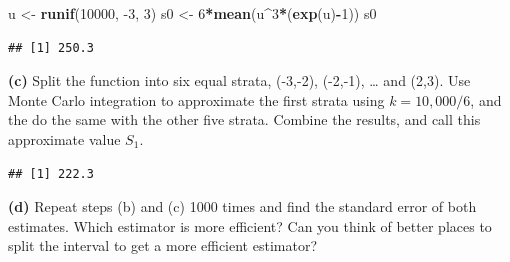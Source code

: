 \documentclass[
]{article}
\newenvironment{Shaded}{\begin{snugshade}}{\end{snugshade}}
\newcommand{\DecValTok}[1]{\textcolor[rgb]{0.00,0.00,0.81}{#1}}
\newcommand{\KeywordTok}[1]{\textcolor[rgb]{0.13,0.29,0.53}{\textbf{#1}}}
\newcommand{\NormalTok}[1]{#1}
\newcommand{\OperatorTok}[1]{\textcolor[rgb]{0.81,0.36,0.00}{\textbf{#1}}}
\newcommand{\StringTok}[1]{\textcolor[rgb]{0.31,0.60,0.02}{#1}}
\begin{document}
\begin{Shaded}
\begin{Highlighting}[]
\NormalTok{u <-}\StringTok{ }\KeywordTok{runif}\NormalTok{(}\DecValTok{10000}\NormalTok{, }\DecValTok{-3}\NormalTok{, }\DecValTok{3}\NormalTok{)}
\NormalTok{s0 <-}\StringTok{ }\DecValTok{6}\OperatorTok{*}\KeywordTok{mean}\NormalTok{(u}\OperatorTok{^}\DecValTok{3}\OperatorTok{*}\NormalTok{(}\KeywordTok{exp}\NormalTok{(u)}\OperatorTok{-}\DecValTok{1}\NormalTok{))}
\NormalTok{s0}
\end{Highlighting}
\end{Shaded}

\begin{verbatim}
## [1] 250.3
\end{verbatim}

\textbf{(c)} Split the function into six equal strata, (-3,-2), (-2,-1),
\ldots{} and (2,3). Use Monte Carlo integration to approximate the first
strata using \(k=10,000/6\), and the do the same with the other five
strata. Combine the results, and call this approximate value \(S_1\).

\begin{verbatim}
## [1] 222.3
\end{verbatim}

\textbf{(d)} Repeat steps (b) and (c) 1000 times and find the standard
error of both estimates. Which estimator is more efficient? Can you
think of better places to split the interval to get a more efficient
estimator?
\end{document}
